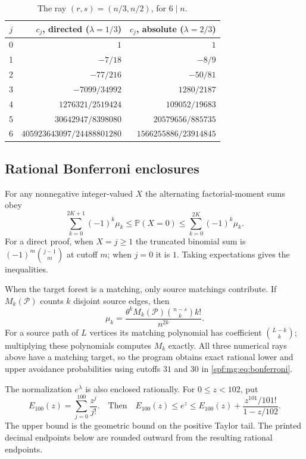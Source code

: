 \documentclass[11pt]{article}
\numberwithin{equation}{section}
\theoremstyle{definition}
\theoremstyle{remark}
\theoremstyle{definition}
\newcommand{\Pp}{\mathbb P}
\newcommand{\fall}[2]{{#1}^{\underline{#2}}}
\begin{document}
\begin{table}[htbp]
\centering\small
\renewcommand{\arraystretch}{1.25}
\begin{tabular}{@{}crr@{}}
\toprule
$j$ & $c_j$, directed ($\lambda=1/3$) & $c_j$, absolute ($\lambda=2/3$)\\
\midrule
0 & $1$ & $1$\\
1 & $-7/18$ & $-8/9$\\
2 & $-77/216$ & $-50/81$\\
3 & $-7099/34992$ & $1280/2187$\\
4 & $1276321/2519424$ & $109052/19683$\\
5 & $30642947/8398080$ & $20579656/885735$\\
6 & $405923643097/24488801280$ & $1566255886/23914845$\\
\bottomrule
\end{tabular}
\caption{The ray $(r,s)=(n/3,n/2)$, for $6\mid n$.}
\label{spf:mg:tab:coeff-third}
\end{table}

\subsection{Rational Bonferroni enclosures}

For any nonnegative integer-valued $X$ the alternating factorial-moment
sums obey
\begin{equation}
 \sum_{k=0}^{2K+1}(-1)^k\mu_k
 \le\Pp(X=0)\le
 \sum_{k=0}^{2K}(-1)^k\mu_k.
 \label{spf:mg:eq:bonferroni}
\end{equation}
For a direct proof, when $X=j\ge1$ the truncated binomial sum is
$(-1)^m\binom{j-1}{m}$ at cutoff $m$; when $j=0$ it is $1$.
Taking expectations gives the inequalities.

When the target forest is a matching, only source matchings contribute.
If $M_k(\mathcal P)$ counts $k$ disjoint source edges, then
\begin{equation}
 \mu_k=\frac{\theta^kM_k(\mathcal P)\binom{n-s}{k}k!}{\fall n{2k}}.
 \label{spf:mg:eq:target-matching}
\end{equation}
For a source path of $L$ vertices its matching polynomial has coefficient
$\binom{L-k}{k}$; multiplying these polynomials computes $M_k$ exactly.
All three numerical rays above have a matching target, so the program
obtains exact rational lower and upper avoidance probabilities using
cutoffs $31$ and $30$ in \eqref{spf:mg:eq:bonferroni}.

The normalization $e^\lambda$ is also enclosed rationally. For
$0\le z<102$, put
\begin{equation}
 E_{100}(z)=\sum_{j=0}^{100}\frac{z^j}{j!}.
 \quad\text{Then}\quad
 E_{100}(z)\le e^z\le E_{100}(z)+
       \frac{z^{101}/101!}{1-z/102}.
 \label{spf:mg:eq:exp-enclosure}
\end{equation}
The upper bound is the geometric bound on the positive Taylor tail.
The printed decimal endpoints below are rounded outward from the
resulting rational endpoints.
\end{document}
